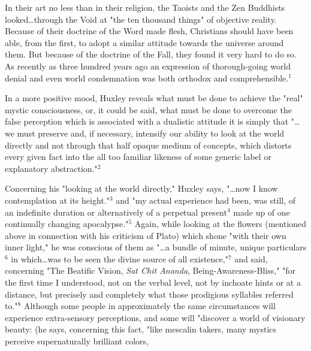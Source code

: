 \begin{center}
	\parbox{0.8\textwidth}{
		\hspace*{5mm}In their art no less than in their religion, the Taoists
		and the Zen Buddhists looked\dots through the Void at "the ten
		thousand things" of objective reality. Because of their doctrine
		of the Word made flesh, Christians should have been
		able, from the first, to adopt a similar attitude towards
		the universe around them. But because of the doctrine of
		the Fall, they found it very hard to do so. As recently as
		three hundred years ago an expression of thorough-going
		world denial and even world condemnation was both orthodox
		and comprehensible.$^{1}$\par
	}%
\end{center}
\hspace*{5mm}In a more positive mood, Huxley reveals what must be done to achieve
the "real" mystic consciousness, or, it could be said, what must be done to overcome the
false perception which is associated with a dualistic attitude it is simply
that "\dots we must preserve and, if necessary, intensify our
ability to look at the world directly and not through that
half opaque medium of concepts, which distorts every given fact into the
all too familiar likeness of some generic label or explanatory abstraction."$^{2}$\par
\vspace*{0.5\baselineskip}
Concerning his "looking at the world directly," Huxley
says, "\dots now I know contemplation at its height."$^{3}$ and
"my actual experience had been, was still, of an indefinite
duration or alternatively of a perpetual present$^{4}$ made up of
one continually changing apocalypse."$^{5}$ Again, while looking at the
flowers (mentioned above in connection with his criticism of Plato)
which shone "with their own inner light,"
he was conscious of them as "\dots a bundle of minute, unique
particulars$^{6}$ in which\dots was to be seen the divine source of
all existence,"$^{7}$ and said, concerning "The Beatific Vision,
\textit{Sat Chit Ananda}, Being-Awareness-Bliss," "for the first
time I understood, not on the verbal level, not by inchoate hints or
at a distance, but precisely and completely what those
prodigious syllables referred to."$^{8}$ Although some people in
approximately the same circumstances will experience extra-sensory
perceptions, and some will "discover a world of visionary beauty: (he says, concerning this
fact, "like mescalin takers, many mystics perceive supernaturally brilliant colors,

